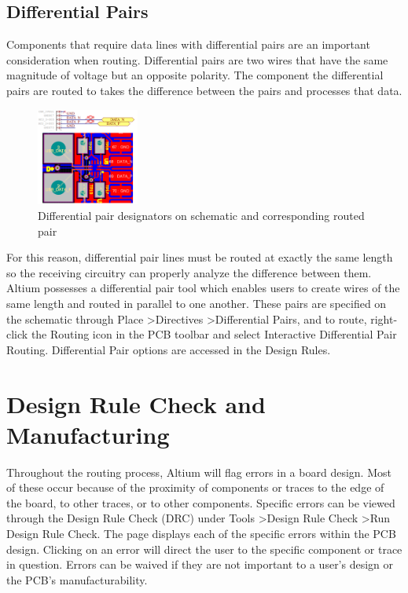 \documentclass[twocolumn]{article}
\begin{document}
\subsection{Differential Pairs}
Components that require data lines with differential pairs are an important consideration when routing. Differential pairs are two wires that have the same magnitude of voltage but an opposite polarity. The component the differential pairs are routed to takes the difference between the pairs 
and processes that data. 

\begin{figure}
    \centering
    \includegraphics[width=0.3\textwidth]{differential pair.png}
    \caption{Differential pair designators on schematic and corresponding routed pair}
    \label{fig:differential-pair}
\end{figure}

For this reason, differential pair lines must be routed at exactly the same length so the receiving circuitry can properly analyze the difference between them. Altium possesses a differential pair tool which enables users to create wires of the same length and routed in parallel to one another. These pairs are specified on the schematic through Place \textgreater Directives \textgreater Differential Pairs, and to route, right-click the Routing icon in the PCB toolbar and select Interactive Differential Pair Routing. Differential Pair options are accessed in the Design Rules. 

\section{Design Rule Check and Manufacturing}

Throughout the routing process, Altium will flag errors in a board design. Most of these occur because of the proximity of components or traces to the edge of the board, to other traces, or to other components. Specific errors can be viewed through the Design Rule Check (DRC) under Tools \textgreater Design Rule Check \textgreater Run Design Rule Check. The page displays each of the specific errors within the PCB design. Clicking on an error will direct the user to the specific component or trace in question. Errors can be waived if they are not important to a user’s design or the PCB’s manufacturability. 
\end{document}
